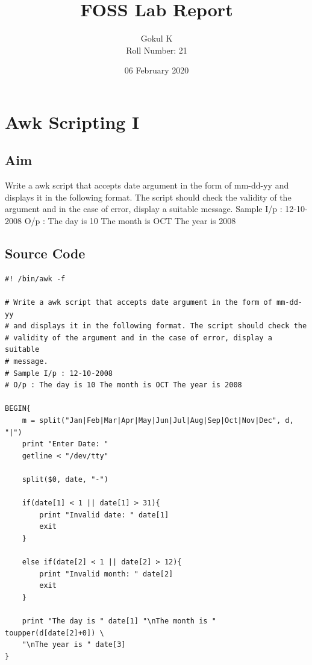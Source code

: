 \documentclass{article}
\begin{document}
\title{FOSS Lab Report}
\author{Gokul K\\[2\baselineskip]
Roll Number: 21\\[2\baselineskip]}
\date{06 February 2020}

\maketitle

\setcounter{section}{19}
\section{Awk Scripting I}
\subsection{Aim}
Write a awk script that accepts date argument in the form of mm-dd-yy 
and displays it in the following format. The script should check the 
validity of the argument and in the case of error, display a suitable 
message.\newline
Sample I/p : 12-10-2008\newline
O/p : The day is 10 The month is OCT The year is 2008\newline

\subsection{Source Code}
\begin{verbatim}
#! /bin/awk -f

# Write a awk script that accepts date argument in the form of mm-dd-yy 
# and displays it in the following format. The script should check the 
# validity of the argument and in the case of error, display a suitable 
# message.
# Sample I/p : 12-10-2008
# O/p : The day is 10 The month is OCT The year is 2008

BEGIN{
    m = split("Jan|Feb|Mar|Apr|May|Jun|Jul|Aug|Sep|Oct|Nov|Dec", d, "|")
    print "Enter Date: "
    getline < "/dev/tty"

    split($0, date, "-")
    
    if(date[1] < 1 || date[1] > 31){
        print "Invalid date: " date[1]
        exit
    }

    else if(date[2] < 1 || date[2] > 12){
        print "Invalid month: " date[2]
        exit
    }

    print "The day is " date[1] "\nThe month is " toupper(d[date[2]+0]) \
    "\nThe year is " date[3]
}
\end{verbatim}
\end{document}
